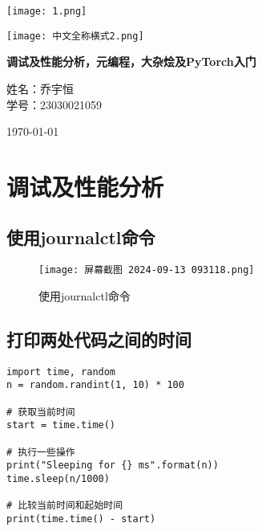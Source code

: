 \documentclass[a4paper, 12pt]{article}
\begin{document}
\begin{titlepage}
 \centering
    \texttt{[image: 1.png]}
    
    \vspace{-1.5em} %
    
    \texttt{[image: 中文全称横式2.png]}
    
    \Huge
    \textbf{调试及性能分析，元编程，大杂烩及PyTorch入门} %
    
    \vspace{1in} %
    
    \Large
    \songti 
    姓名：乔宇恒
    \\学号：23030021059
    
    \vspace{1in} %
    
    \Large
    \today 
    
    \vfill %

    \thispagestyle{empty} %
\end{titlepage}

\tableofcontents
\newpage

\section{调试及性能分析}

\subsection{使用journalctl命令}
\begin{figure}[H]
    \centering
    \texttt{[image: 屏幕截图 2024-09-13 093118.png]}
    \caption{使用journalctl命令}
\end{figure}


\subsection{打印两处代码之间的时间}
\begin{lstlisting}
import time, random
n = random.randint(1, 10) * 100

# 获取当前时间
start = time.time()

# 执行一些操作
print("Sleeping for {} ms".format(n))
time.sleep(n/1000)

# 比较当前时间和起始时间
print(time.time() - start)
\end{lstlisting}
\end{document}
